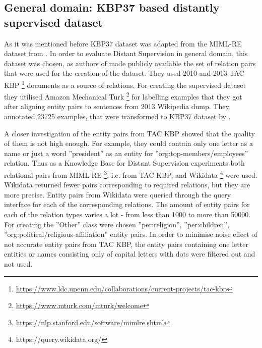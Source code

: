 \subsection{General domain: KBP37 based distantly supervised dataset} 
As it was mentioned before KBP37 dataset was adapted from the MIML-RE dataset from 
\cite{angeli2014combining}. In order to evaluate Distant Supervision in general domain, this dataset was 
chosen, as authors of \cite{angeli2014combining} made publicly available the set of relation 
pairs that were used for the creation of the dataset. They used 2010 and 2013 TAC KBP \footnote{\url{https://www.ldc.upenn.edu/collaborations/current-projects/tac-kbp}} documents as a source of relations. 
For creating the supervised dataset they utilised Amazon Mechanical Turk \footnote{\url{https://www.mturk.com/mturk/welcome}} for labelling examples that they got after aligning entity pairs to 
sentences from 2013 Wikipedia dump. They annotated 23725 examples, that were transformed to 
KBP37 dataset by \cite{DBLP:journals/corr/ZhangW15a}.

A closer investigation of the entity pairs from TAC KBP showed that the quality of them is 
not high enough. For example, they could contain only one letter as a name or just a word ''president'' as an entity 
for ''org:top-members/employees'' relation.
Thus as a Knowledge Base for Distant Supervision experiments both relational pairs from MIML-RE 
\footnote{\url{https://nlp.stanford.edu/software/mimlre.shtml}}, i.e. from TAC KBP, and Wikidata 
\footnote{https://query.wikidata.org/} were used. Wikidata returned fewer pairs 
corresponding to required relations, but they are more precise. Entity pairs from Wikidata were 
queried through the query interface for each of the corresponding relations.  
The amount of entity pairs for each of the relation types varies a lot - from less than 1000 to more than 
50000. For creating the ''Other'' class were chosen ''per:religion'', ''per:children'', ''org:political/religious-affiliation'' 
entity pairs. In order to minimise noise effect of not accurate entity pairs from TAC KBP, 
the entity pairs containing one letter entities or names consisting only of capital letters with dots were filtered out and not used.

